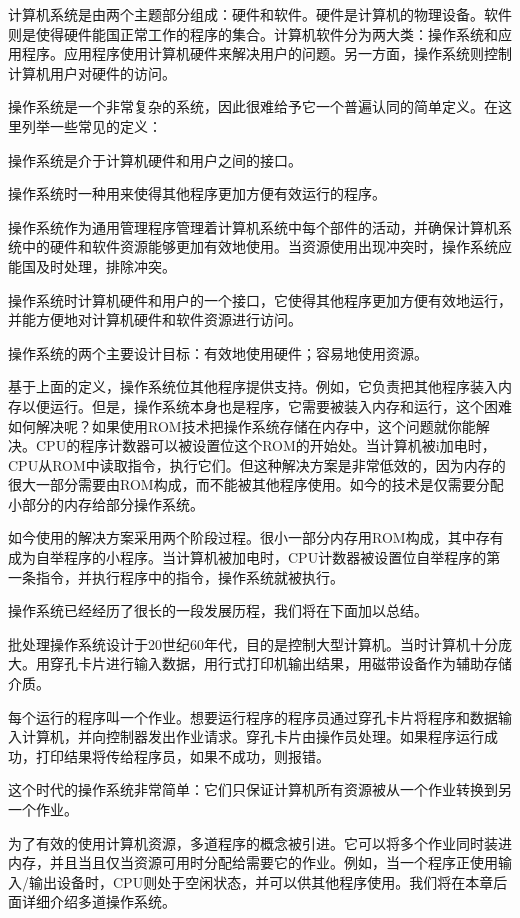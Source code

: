 
计算机系统是由两个主题部分组成：硬件和软件。硬件是计算机的物理设备。软件则是使得硬件能国正常工作的程序的集合。计算机软件分为两大类：操作系统和应用程序。应用程序使用计算机硬件来解决用户的问题。另一方面，操作系统则控制计算机用户对硬件的访问。

操作系统是一个非常复杂的系统，因此很难给予它一个普遍认同的简单定义。在这里列举一些常见的定义：

操作系统是介于计算机硬件和用户之间的接口。

操作系统时一种用来使得其他程序更加方便有效运行的程序。

操作系统作为通用管理程序管理着计算机系统中每个部件的活动，并确保计算机系统中的硬件和软件资源能够更加有效地使用。当资源使用出现冲突时，操作系统应能国及时处理，排除冲突。

操作系统时计算机硬件和用户的一个接口，它使得其他程序更加方便有效地运行，并能方便地对计算机硬件和软件资源进行访问。

操作系统的两个主要设计目标：有效地使用硬件；容易地使用资源。

基于上面的定义，操作系统位其他程序提供支持。例如，它负责把其他程序装入内存以便运行。但是，操作系统本身也是程序，它需要被装入内存和运行，这个困难如何解决呢？如果使用ROM技术把操作系统存储在内存中，这个问题就你能解决。CPU的程序计数器可以被设置位这个ROM的开始处。当计算机被i加电时，CPU从ROM中读取指令，执行它们。但这种解决方案是非常低效的，因为内存的很大一部分需要由ROM构成，而不能被其他程序使用。如今的技术是仅需要分配小部分的内存给部分操作系统。

如今使用的解决方案采用两个阶段过程。很小一部分内存用ROM构成，其中存有成为自举程序的小程序。当计算机被加电时，CPU计数器被设置位自举程序的第一条指令，并执行程序中的指令，操作系统就被执行。

操作系统已经经历了很长的一段发展历程，我们将在下面加以总结。

批处理操作系统设计于20世纪60年代，目的是控制大型计算机。当时计算机十分庞大。用穿孔卡片进行输入数据，用行式打印机输出结果，用磁带设备作为辅助存储介质。

每个运行的程序叫一个作业。想要运行程序的程序员通过穿孔卡片将程序和数据输入计算机，并向控制器发出作业请求。穿孔卡片由操作员处理。如果程序运行成功，打印结果将传给程序员，如果不成功，则报错。

这个时代的操作系统非常简单：它们只保证计算机所有资源被从一个作业转换到另一个作业。

为了有效的使用计算机资源，多道程序的概念被引进。它可以将多个作业同时装进内存，并且当且仅当资源可用时分配给需要它的作业。例如，当一个程序正使用输入/输出设备时，CPU则处于空闲状态，并可以供其他程序使用。我们将在本章后面详细介绍多道操作系统。

